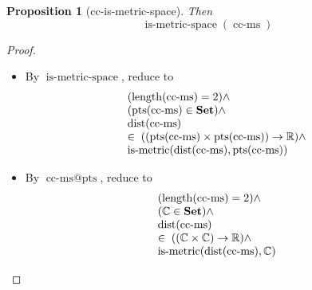 \documentclass[11pt]{article}
\theoremstyle{plain}
\newtheorem{proposition}{Proposition}
\begin{document}
\begin{proposition}[cc-is-metric-space]
Then
\begin{equation*}
\operatorname{is\text{-}metric\text{-}space}(\operatorname{cc\text{-}ms})
\end{equation*}

\end{proposition}

\begin{proof}
\begin{itemize}[leftmargin=2.8em, itemsep=4pt, parsep=1pt]
  \item[\textbf{1}] By $\operatorname{is\text{-}metric\text{-}space}$, reduce to
\begin{equation*}
\begin{array}{@{}l@{}} (\operatorname{length}(\operatorname{cc\text{-}ms}) = 2) \wedge \\ (\operatorname{pts}(\operatorname{cc\text{-}ms}) \in \mathbf{Set}) \wedge \\ \operatorname{dist}(\operatorname{cc\text{-}ms}) \\ \in\; ((\operatorname{pts}(\operatorname{cc\text{-}ms}) \times \operatorname{pts}(\operatorname{cc\text{-}ms})) \to \mathbb{R}) \wedge \\ \operatorname{is\text{-}metric}(\operatorname{dist}(\operatorname{cc\text{-}ms}), \operatorname{pts}(\operatorname{cc\text{-}ms})) \end{array}
\end{equation*}

  \item[\textbf{2}] By $\operatorname{cc\text{-}ms@pts}$, reduce to
\begin{equation*}
\begin{array}{@{}l@{}} (\operatorname{length}(\operatorname{cc\text{-}ms}) = 2) \wedge \\ (\mathbb{C} \in \mathbf{Set}) \wedge \\ \operatorname{dist}(\operatorname{cc\text{-}ms}) \\ \in\; ((\mathbb{C} \times \mathbb{C}) \to \mathbb{R}) \wedge \\ \operatorname{is\text{-}metric}(\operatorname{dist}(\operatorname{cc\text{-}ms}), \mathbb{C}) \end{array}
\end{equation*}


\end{itemize}
\end{proof}
\end{document}

